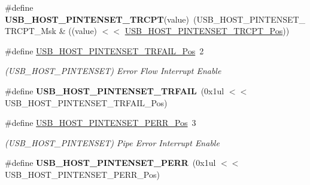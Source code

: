\begin{DoxyCompactItemize}
\item 
\hypertarget{group___s_a_m_l21___u_s_b_gaf76c5a96981b5f0062e41ec7667f31a6}{}\#define {\bfseries U\+S\+B\+\_\+\+H\+O\+S\+T\+\_\+\+P\+I\+N\+T\+E\+N\+S\+E\+T\+\_\+\+T\+R\+C\+P\+T}(value)~(U\+S\+B\+\_\+\+H\+O\+S\+T\+\_\+\+P\+I\+N\+T\+E\+N\+S\+E\+T\+\_\+\+T\+R\+C\+P\+T\+\_\+\+Msk \& ((value) $<$$<$ \hyperlink{group___s_a_m_l21___u_s_b_gaa8d9cbab5a85407960e0d987baa97e88}{U\+S\+B\+\_\+\+H\+O\+S\+T\+\_\+\+P\+I\+N\+T\+E\+N\+S\+E\+T\+\_\+\+T\+R\+C\+P\+T\+\_\+\+Pos}))\label{group___s_a_m_l21___u_s_b_gaf76c5a96981b5f0062e41ec7667f31a6}

\item 
\hypertarget{group___s_a_m_l21___u_s_b_gafbb9bdaeb83cb5980a0e4dc15c45003c}{}\#define \hyperlink{group___s_a_m_l21___u_s_b_gafbb9bdaeb83cb5980a0e4dc15c45003c}{U\+S\+B\+\_\+\+H\+O\+S\+T\+\_\+\+P\+I\+N\+T\+E\+N\+S\+E\+T\+\_\+\+T\+R\+F\+A\+I\+L\+\_\+\+Pos}~2\label{group___s_a_m_l21___u_s_b_gafbb9bdaeb83cb5980a0e4dc15c45003c}

\begin{DoxyCompactList}\small\item\em (U\+S\+B\+\_\+\+H\+O\+S\+T\+\_\+\+P\+I\+N\+T\+E\+N\+S\+E\+T) Error Flow Interrupt Enable \end{DoxyCompactList}\item 
\hypertarget{group___s_a_m_l21___u_s_b_ga5a5c18c980841b6e7142313ac6990229}{}\#define {\bfseries U\+S\+B\+\_\+\+H\+O\+S\+T\+\_\+\+P\+I\+N\+T\+E\+N\+S\+E\+T\+\_\+\+T\+R\+F\+A\+I\+L}~(0x1ul $<$$<$ U\+S\+B\+\_\+\+H\+O\+S\+T\+\_\+\+P\+I\+N\+T\+E\+N\+S\+E\+T\+\_\+\+T\+R\+F\+A\+I\+L\+\_\+\+Pos)\label{group___s_a_m_l21___u_s_b_ga5a5c18c980841b6e7142313ac6990229}

\item 
\hypertarget{group___s_a_m_l21___u_s_b_ga697d9ca2c5d3dca91806202f8c093c16}{}\#define \hyperlink{group___s_a_m_l21___u_s_b_ga697d9ca2c5d3dca91806202f8c093c16}{U\+S\+B\+\_\+\+H\+O\+S\+T\+\_\+\+P\+I\+N\+T\+E\+N\+S\+E\+T\+\_\+\+P\+E\+R\+R\+\_\+\+Pos}~3\label{group___s_a_m_l21___u_s_b_ga697d9ca2c5d3dca91806202f8c093c16}

\begin{DoxyCompactList}\small\item\em (U\+S\+B\+\_\+\+H\+O\+S\+T\+\_\+\+P\+I\+N\+T\+E\+N\+S\+E\+T) Pipe Error Interrupt Enable \end{DoxyCompactList}\item 
\hypertarget{group___s_a_m_l21___u_s_b_gae44f813170a08657fbc070ab1bdedd54}{}\#define {\bfseries U\+S\+B\+\_\+\+H\+O\+S\+T\+\_\+\+P\+I\+N\+T\+E\+N\+S\+E\+T\+\_\+\+P\+E\+R\+R}~(0x1ul $<$$<$ U\+S\+B\+\_\+\+H\+O\+S\+T\+\_\+\+P\+I\+N\+T\+E\+N\+S\+E\+T\+\_\+\+P\+E\+R\+R\+\_\+\+Pos)\label{group___s_a_m_l21___u_s_b_gae44f813170a08657fbc070ab1bdedd54}


\end{DoxyCompactItemize}
